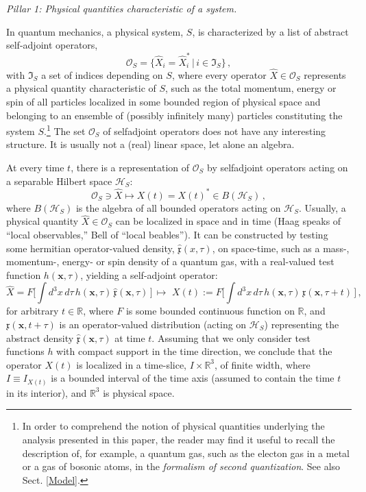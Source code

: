 \documentclass[12pt]{article}
\begin{document}
\textit{{Pillar 1}: Physical quantities characteristic of a system.}

In quantum mechanics, a physical system, $S$, is characterized by a list of abstract self-adjoint operators,
\begin{equation}\label{phys quantities}
\mathcal{O}_{S}= \big\{\hat{X}_i = \hat{X}^{*}_i\,\vert\, i \in \mathfrak{I}_S\big\}\,,
\end{equation}
with $\mathfrak{I}_S$ a set of indices depending on $S$, where every operator $\hat{X} \in \mathcal{O}_S$ represents a
physical quantity characteristic of $S$, such as the total momentum, energy or spin of all particles localized in some bounded
region of physical space and belonging to an ensemble of (possibly infinitely many) particles constituting the system $S$.\footnote{In order to comprehend the notion of physical quantities underlying the analysis presented in this paper, the reader
may find it useful to recall the description of, for example, a quantum gas, such as the electon gas in a metal or a gas of
bosonic atoms, in the \textit{formalism of second quantization}. See also Sect. \ref{Model}.} The set $\mathcal{O}_S$ of selfadjoint operators does not have any interesting structure. It is usually not a (real) linear space, let alone an algebra.

At every time $t$, there is a representation of
$\mathcal{O}_S$ by selfadjoint operators acting on a separable Hilbert space $\mathcal{H}_S$:
\begin{equation}\label{Rep}
\mathcal{O}_S \ni \hat{X} \mapsto X(t)= X(t)^{*} \in B(\mathcal{H}_S)\,,
\end{equation}
where $B(\mathcal{H}_S)$ is the algebra of all bounded operators
acting on $\mathcal{H}_S$. Usually, a physical quantity $\hat{X}\in
\mathcal{O}_S$ can be localized in space and in time ({Haag}
\cite{Haag} speaks of ``local observables,'' {Bell} \cite{Bell}
of ``local beables''). It can be constructed by testing some hermitian
operator-valued density, $\hat{\mathfrak{x}}(x,\tau)$, on space-time,
such as a mass-, momentum-, energy- or spin density of a quantum gas,
with a real-valued test function $h(\mathbf{x},\tau)$, yielding a
self-adjoint operator:
\begin{equation}\label{phys quantity}
\hat{X}=F\Big[\int d^{3}x\, d\tau\, h(\mathbf{x},\tau)\, \hat{\mathfrak{x}}(\mathbf{x},\tau)\,\Big]\, \mapsto \,\,
X(t) := F\Big[ \int d^{3}x \, d\tau \,h(\mathbf{x},\tau)\, \mathfrak{x}(\mathbf{x}, \tau+ t)\,\Big]\,,
\end{equation}
for arbitrary $t\in \mathbb{R}$, where $F$ is some bounded continuous function on $\mathbb{R}$, and $\mathfrak{x}(\mathbf{x},t+\tau)$
is an operator-valued distribution (acting on $\mathcal{H}_S$)
representing the abstract density $\hat{\mathfrak{x}}(\mathbf{x}, \tau)$ at time $t$.
Assuming that we only consider test functions $h$ with compact support in the time direction, we conclude that the operator
$X(t)$ is localized in a time-slice, $I\times \mathbb{R}^{3}$, of finite width, where $I\equiv I_{X(t)}$ is a bounded interval of the
time axis (assumed to contain the time $t$ in its interior), and $\mathbb{R}^{3}$ is physical space.\\
\end{document}
